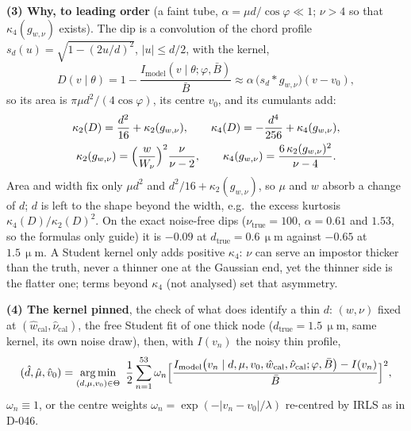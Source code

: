 \documentclass[11pt,varwidth=17.6cm,border=14pt]{standalone}
\DeclareMathOperator*{\argmin}{arg\,min}
\newcommand{\um}{\,\upmu\mathrm{m}}
\newcommand{\Imod}{I_{\mathrm{model}}}
\begin{document}
\medskip
\textbf{(3) Why, to leading order} (a faint tube, $\alpha=\mu d/\cos\varphi\ll1$; $\nu>4$ so that $\kappa_4(g_{w,\nu})$ exists). The dip is a convolution of the chord profile $s_d(u)=\sqrt{1-(2u/d)^{2}}$, $\lvert u\rvert\le d/2$, with the kernel,
\begin{equation*}
D(v\mid\theta)=1-\frac{\Imod(v\mid\theta;\varphi,\bar B)}{\bar B}\approx\alpha\,\bigl(s_d*g_{w,\nu}\bigr)(v-v_0),
\end{equation*}
so its area is $\pi\mu d^{2}/(4\cos\varphi)$, its centre $v_0$, and its cumulants add:
\begin{gather*}
\kappa_2(D)=\frac{d^{2}}{16}+\kappa_2(g_{w,\nu}),\qquad
\kappa_4(D)=-\frac{d^{4}}{256}+\kappa_4(g_{w,\nu}),\\
\kappa_2(g_{w,\nu})=\Bigl(\frac{w}{W_\nu}\Bigr)^{2}\frac{\nu}{\nu-2},\qquad
\kappa_4(g_{w,\nu})=\frac{6\,\kappa_2(g_{w,\nu})^{2}}{\nu-4}.
\end{gather*}
Area and width fix only $\mu d^{2}$ and $d^{2}/16+\kappa_2(g_{w,\nu})$, so $\mu$ and $w$ absorb a change of $d$; $d$ is left to the shape beyond the width, e.g.\ the excess kurtosis $\kappa_4(D)/\kappa_2(D)^{2}$. On the exact noise-free dips ($\nu_{\mathrm{true}}=100$, $\alpha=0.61$ and $1.53$, so the formulas only guide) it is $-0.09$ at $d_{\mathrm{true}}=0.6\um$ against $-0.65$ at $1.5\um$. A Student kernel only adds positive $\kappa_4$: $\nu$ can serve an impostor thicker than the truth, never a thinner one at the Gaussian end, yet the thinner side is the flatter one; terms beyond $\kappa_4$ (not analysed) set that asymmetry.

\medskip
\textbf{(4) The kernel pinned}, the check of what does identify a thin $d$: $(w,\nu)$ fixed at $(\hat w_{\mathrm{cal}},\hat\nu_{\mathrm{cal}})$, the free Student fit of one thick node ($d_{\mathrm{true}}=1.5\um$, same kernel, its own noise draw), then, with $I(v_n)$ the noisy thin profile,
\begin{equation*}
(\hat d,\hat\mu,\hat v_0)=\argmin_{(d,\mu,v_0)\in\Theta}\ \frac12\sum_{n=1}^{53}\omega_n\Bigl[\frac{\Imod\bigl(v_n\mid d,\mu,v_0,\hat w_{\mathrm{cal}},\hat\nu_{\mathrm{cal}};\varphi,\bar B\bigr)-I(v_n)}{\bar B}\Bigr]^{2},
\end{equation*}
$\omega_n\equiv1$, or the centre weights $\omega_n=\exp(-\lvert v_n-v_0\rvert/\lambda)$ re-centred by IRLS as in D-046.
\end{document}
